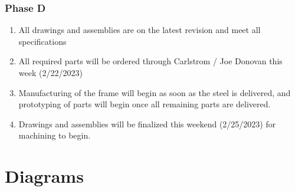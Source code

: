 \documentclass[aspectratio=169]{beamer}
\begin{document}
\begin{frame}
    \frametitle{Phase D}

    \begin{enumerate}
        \item All drawings and assemblies are on the latest revision and meet all specifications
        \item All required parts will be ordered through Carlstrom / Joe Donovan this week (2/22/2023)
        \item Manufacturing of the frame will begin as soon as the steel is delivered, and prototyping of parts will begin once all remaining parts are delivered.
        \item Drawings and assemblies will be finalized this weekend (2/25/2023) for machining to begin.
    \end{enumerate}


\end{frame}


\section{Diagrams}
\end{document}
